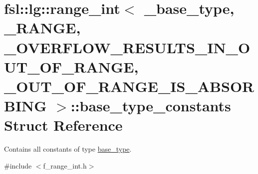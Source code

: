 \hypertarget{structfsl_1_1lg_1_1range__int_1_1base__type__constants}{}\section{fsl\+::lg\+::range\+\_\+int$<$ \+\_\+base\+\_\+type, \+\_\+\+R\+A\+N\+GE, \+\_\+\+O\+V\+E\+R\+F\+L\+O\+W\+\_\+\+R\+E\+S\+U\+L\+T\+S\+\_\+\+I\+N\+\_\+\+O\+U\+T\+\_\+\+O\+F\+\_\+\+R\+A\+N\+GE, \+\_\+\+O\+U\+T\+\_\+\+O\+F\+\_\+\+R\+A\+N\+G\+E\+\_\+\+I\+S\+\_\+\+A\+B\+S\+O\+R\+B\+I\+NG $>$\+::base\+\_\+type\+\_\+constants Struct Reference}
\label{structfsl_1_1lg_1_1range__int_1_1base__type__constants}


Contains all constants of type \mbox{\hyperlink{classfsl_1_1lg_1_1range__int_a4ce67cd216fd303b7bae83a7cbcab3bb}{base\+\_\+type}}.  




{\ttfamily \#include $<$f\+\_\+range\+\_\+int.\+h$>$}

